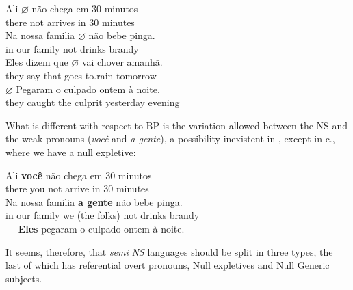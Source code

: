 \documentclass[output=paper]{langsci/langscibook}
\begin{document}
\ea%
    \label{ex:key:26.51}
    \ea
    \gll    Ali $\varnothing$ não chega  em 30 minutos\\
            there {} not arrives in 30 minutes\\
    \ex
    \gll    Na nossa familia $\varnothing$ não bebe pinga.\\
            in   our family {}       not drinks brandy\\
    \ex
    \gll    Eles dizem que $\varnothing$  vai  chover  amanhã.\\
            they say  that {}   goes to.rain   tomorrow\\
    \ex
    \gll    $\varnothing$ Pegaram o culpado ontem à noite.\\
            {} they caught   the culprit  yesterday evening\\
    \z
\z

What is different with respect to \gls{BP} is the
variation allowed between the NS and the weak pronouns (\emph{você} and \emph{a
gente}), a possibility inexistent in , except in c., where we have a
null expletive:

\ea%
    \label{ex:key:26.52}
    \ea
    \gll    Ali    \textbf{você} não chega em 30 minutos\\
            there you  not  arrive in 30 minutes\\
    \ex
    \gll    Na nossa familia \textbf{a gente }              não bebe pinga.\\
            in   our family {we (the folks)}  not drinks brandy\\
    \ex ---\footnotemark{}
    \ex     \textbf{Eles} pegaram o culpado ontem à noite.
    \z
\z
{}

It seems, therefore, that \emph{semi} \emph{NS} languages should be split in
three types, the last of which has referential overt pronouns, Null expletives
and Null Generic subjects.
\end{document}

